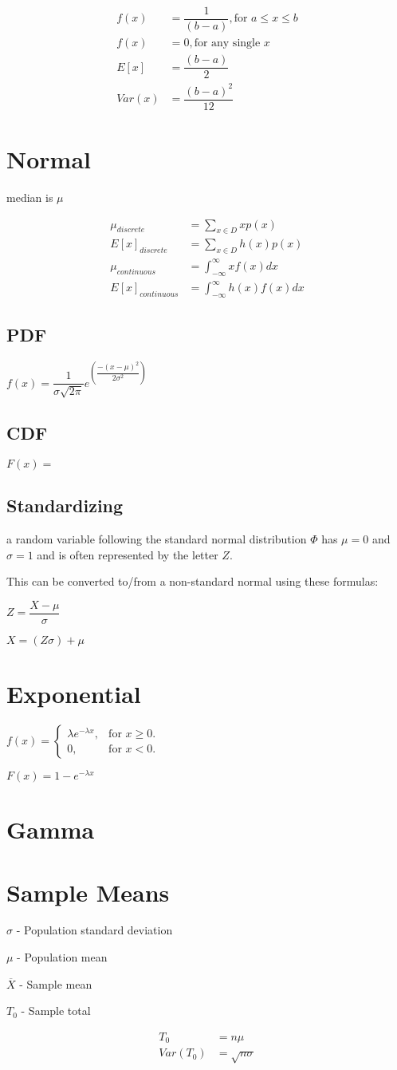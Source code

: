 \documentclass[12pt,fleqn]{article}
\begin{document}
\begin{align*}
	f(x) &= \dfrac{1}{(b-a)}, \text{for $a \le x \le b$}\\
	f(x) &= 0, \text{for any single $x$}\\
	E[x] &= \dfrac{(b-a)}{2}\\
	Var(x) &=\dfrac{(b-a)^2}{12}
\end{align*}

\section{Normal}

median is $\mu$

\begin{align*}
	\mu_{discrete} &= \sum_{x \in D} x p(x)\\
	E[x]_{discrete} &= \sum_{x \in D} h(x) p(x)\\
	\mu_{continuous} &= \int_{-\infty}^{\infty} x f(x) dx\\
	E[x]_{continuous} &= \int_{-\infty}^{\infty} h(x) f(x) dx
\end{align*}

\subsection{PDF}
$f(x) = \dfrac{1}{\sigma\sqrt{2\pi}}e^{(\dfrac{-(x-\mu)^2}{2\sigma^2})}$
\subsection{CDF}
$F(x) = $

\subsection{Standardizing}
a random variable following the standard normal distribution $\Phi$ has $\mu = 0$ and $\sigma = 1$ and is often represented by the letter $Z$.

This can be converted to/from a non-standard normal using these formulas:

$Z = \dfrac{X-\mu}{\sigma}$


$X = (Z \sigma) + \mu$


\section{Exponential}


$
f(x)=\begin{cases}
\lambda e^{-\lambda x}, & \text{for $x\ge0$}.\\
0, & \text{for $x<0$}.
\end{cases}
$

$ F(x)=1-e^{-\lambda x} $
\section{Gamma}


\section{Sample Means}

$\sigma$ - Population standard deviation

$\mu$ - Population mean

$\overline{X}$ - Sample mean

$T_0$ - Sample total

\begin{align*}
T_0 &= n\mu\\
Var(T_0) &= \sqrt{n\sigma}
\end{align*}
\end{document}
